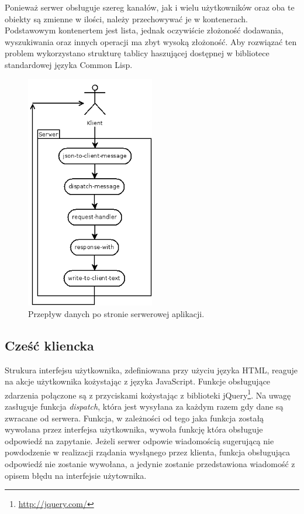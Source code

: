 Ponieważ serwer obsługuje szereg kanałów, jak i wielu użytkowników oraz oba te obiekty są zmienne w ilości, należy przechowywać je w kontenerach. Podstawowym kontenertem jest lista, jednak oczywiście złożoność dodawania, wyszukiwania oraz innych operacji ma zbyt wysoką złożoność. Aby rozwiązać ten problem wykorzystano strukturę tablicy haszującej dostępnej w bibliotece standardowej języka Common Lisp.
\begin{figure}[ht]
    \centering
    \includegraphics[width=0.5\textwidth]{imgs/serverflow.png}
    \caption{Przepływ danych po stronie serwerowej aplikacji.}
    \label{fig:serverflow}
\end{figure}

\subsection{Cześć kliencka}
Strukura interfejsu użytkownika, zdefiniowana przy użyciu języka HTML, reaguje na akcje użytkownika kożystając z języka JavaScript. Funkcje obsługujące zdarzenia połączone są z przyciskami kożystając z biblioteki jQuery\footnote{\url{http://jquery.com/}}. Na uwagę zasługuje funkcja \emph{dispatch}, która jest wysyłana za każdym razem gdy dane są zwracane od serwera. Funkcja, w zależności od tego jaka funkcja zostałą wywołana przez interfejsa użytkownika, wywoła funkcję która obsługuje odpowiedź na zapytanie. Jeżeli serwer odpowie wiadomością sugerującą nie powdodzenie w realizacji rządania wysłąnego przez klienta, funkcja obsługująca odpowiedź nie zostanie wywołana, a jedynie zostanie przedstawiona wiadomość z opisem błędu na interfejsie użytownika.

